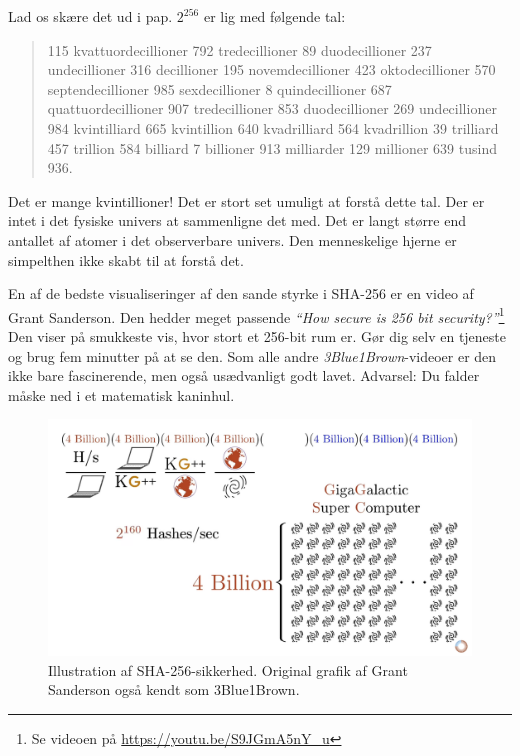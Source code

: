 \documentclass[paper=6in:9in,pagesize=pdftex,
               headinclude=on,footinclude=on,12pt]{scrbook}
\begin{document}
Lad os skære det ud i pap. $2^{256}$ er lig med følgende tal:\begin{quotation}\begin{samepage} 115 kvattuordecillioner 792 tredecillioner 89 duodecillioner 237 undecillioner 316 decillioner 195 novemdecillioner 423 oktodecillioner 570 septendecillioner 985 sexdecillioner 8 quindecillioner 687 quattuordecillioner 907 tredecillioner 853 duodecillioner 269 undecillioner 984 kvintilliard 665 kvintillion 640 kvadrilliard 564 kvadrillion 39 trilliard 457 trillion 584 billiard 7 billioner 913 milliarder 129 millioner 639 tusind 936. \end{samepage}\end{quotation}

Det er mange kvintillioner! Det er stort set umuligt at forstå dette tal. Der er intet i det fysiske univers at sammenligne det med. Det er langt større end antallet af atomer i det observerbare univers. Den menneskelige hjerne er simpelthen ikke skabt til at forstå det.\newpage

En af de bedste visualiseringer af den sande styrke i SHA-256 er en video af Grant Sanderson. Den hedder meget passende \textit{\enquote{How secure is 256 bit security?}}\footnote{Se videoen på \url{https://youtu.be/S9JGmA5nY_u}} Den viser på smukkeste vis, hvor stort et 256-bit rum er. Gør dig selv en tjeneste og brug fem minutter på at se den. Som alle andre \textit{3Blue1Brown}-videoer er den ikke bare fascinerende, men også usædvanligt godt lavet. Advarsel: Du falder måske ned i et matematisk kaninhul.\begin{figure}
  \includegraphics{assets/images/youtube-vid-inverted.png}
  \caption{Illustration af SHA-256-sikkerhed. Original grafik af Grant Sanderson også kendt som 3Blue1Brown.}
  \label{fig:youtube-vid-inverted}
\end{figure}
\end{document}
